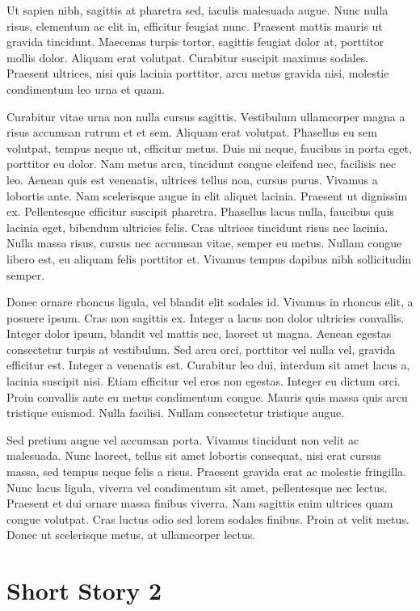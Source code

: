 \documentclass[a4paper]{memoir}
\begin{document}
Ut sapien nibh, sagittis at pharetra sed, iaculis malesuada augue. Nunc nulla risus, elementum ac elit in, efficitur feugiat nunc. Praesent mattis mauris ut gravida tincidunt. Maecenas turpis tortor, sagittis feugiat dolor at, porttitor mollis dolor. Aliquam erat volutpat. Curabitur suscipit maximus sodales. Praesent ultrices, nisi quis lacinia porttitor, arcu metus gravida nisi, molestie condimentum leo urna et quam. 

Curabitur vitae urna non nulla cursus sagittis. Vestibulum ullamcorper magna a risus accumsan rutrum et et sem. Aliquam erat volutpat. Phasellus eu sem volutpat, tempus neque ut, efficitur metus. Duis mi neque, faucibus in porta eget, porttitor eu dolor. Nam metus arcu, tincidunt congue eleifend nec, facilisis nec leo. Aenean quis est venenatis, ultrices tellus non, cursus purus. Vivamus a lobortis ante. Nam scelerisque augue in elit aliquet lacinia. Praesent ut dignissim ex. Pellentesque efficitur suscipit pharetra. Phasellus lacus nulla, faucibus quis lacinia eget, bibendum ultricies felis. Cras ultrices tincidunt risus nec lacinia. Nulla massa risus, cursus nec accumsan vitae, semper eu metus. Nullam congue libero est, eu aliquam felis porttitor et. Vivamus tempus dapibus nibh sollicitudin semper. 

Donec ornare rhoncus ligula, vel blandit elit sodales id. Vivamus in rhoncus elit, a posuere ipsum. Cras non sagittis ex. Integer a lacus non dolor ultricies convallis. Integer dolor ipsum, blandit vel mattis nec, laoreet ut magna. Aenean egestas consectetur turpis at vestibulum. Sed arcu orci, porttitor vel nulla vel, gravida efficitur est. Integer a venenatis est. Curabitur leo dui, interdum sit amet lacus a, lacinia suscipit nisi. Etiam efficitur vel eros non egestas. Integer eu dictum orci. Proin convallis ante eu metus condimentum congue. Mauris quis massa quis arcu tristique euismod. Nulla facilisi. Nullam consectetur tristique augue. 

Sed pretium augue vel accumsan porta. Vivamus tincidunt non velit ac malesuada. Nunc laoreet, tellus sit amet lobortis consequat, nisi erat cursus massa, sed tempus neque felis a risus. Praesent gravida erat ac molestie fringilla. Nunc lacus ligula, viverra vel condimentum sit amet, pellentesque nec lectus. Praesent et dui ornare massa finibus viverra. Nam sagittis enim ultrices quam congue volutpat. Cras luctus odio sed lorem sodales finibus. Proin at velit metus. Donec ut scelerisque metus, at ullamcorper lectus. 

\chapter{Short Story 2}
\label{shortstory2}
\end{document}
